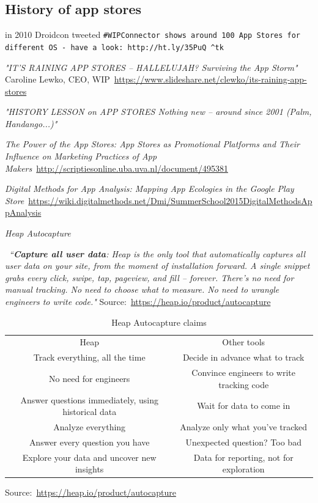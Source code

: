 \subsection{History of app stores}
in 2010 Droidcon tweeted \texttt{#WIPConnector shows around 100 App Stores for different OS - have a look: http://ht.ly/35PuQ ^tk}

\emph{"IT’S RAINING APP STORES – HALLELUJAH? Surviving the App Storm"} Caroline Lewko, CEO, WIP~\url{https://www.slideshare.net/clewko/its-raining-app-stores}

\emph{"HISTORY LESSON on APP STORES Nothing new – around since 2001 (Palm, Handango...)"}

\emph{The Power of the App Stores: App Stores as Promotional Platforms 
and Their Influence on Marketing Practices of App Makers}~\url{http://scriptiesonline.uba.uva.nl/document/495381}

\emph{Digital Methods for App Analysis: Mapping App Ecologies in the Google Play Store}~\url{https://wiki.digitalmethods.net/Dmi/SummerSchool2015DigitalMethodsAppAnalysis}


\textit{Heap Autocapture}
 
~\emph{``\textbf{Capture all user data}: Heap is the only tool that automatically captures all user data on your site, from the moment of installation forward. A single snippet grabs every click, swipe, tap, pageview, and fill – forever. There’s no need for manual tracking. No need to choose what to measure. No need to wrangle engineers to write code."} Source:~\url{https://heap.io/product/autocapture}
 
\begin{table}[]
    \centering
    \begin{tabular}{c|c}
        Heap &Other tools \\
        Track everything, all the time &Decide in advance what to track \\
        No need for engineers &Convince engineers to write tracking code \\
        Answer questions immediately, using historical data &Wait for data to come in \\
        Analyze everything &Analyze only what you’ve tracked \\
        Answer every question you have &Unexpected question? Too bad \\
        Explore your data and uncover new insights &Data for reporting, not for exploration \\
    \end{tabular}
    \caption{Heap Autocapture claims}
    \label{tab:heap_autocapture}
\end{table}
Source:~\url{https://heap.io/product/autocapture}


